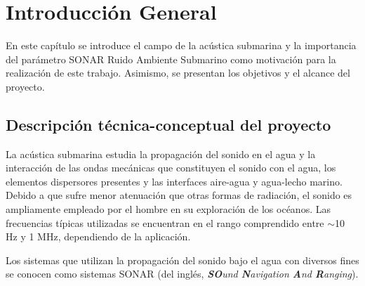 
\chapter{Introducción General} %

\label{Chapter1} %
\label{IntroGeneral}


\newcommand{\keyword}[1]{\textbf{#1}}
\newcommand{\tabhead}[1]{\textbf{#1}}
\newcommand{\code}[1]{\texttt{#1}}
\newcommand{\file}[1]{\texttt{\bfseries#1}}
\newcommand{\option}[1]{\texttt{\itshape#1}}
\newcommand{\grados}{$^{\circ}$}


En este capítulo se introduce el campo de la acústica submarina y la importancia del parámetro SONAR Ruido Ambiente Submarino como motivación para la realización de este trabajo.  Asimismo, se presentan los objetivos y el alcance del proyecto.
\section{Descripción técnica-conceptual del proyecto}


La acústica submarina estudia la propagación del sonido en el agua y la interacción de las ondas mecánicas que constituyen el sonido con el agua, los elementos dispersores presentes y las interfaces aire-agua y agua-lecho marino.  Debido a que sufre menor atenuación que otras formas de radiación, el sonido es ampliamente empleado  por el hombre en su exploración de los océanos.  Las frecuencias típicas utilizadas se encuentran en el rango comprendido entre $\sim$10 Hz y 1 MHz, dependiendo de la aplicación.  

Los sistemas que utilizan la propagación del sonido bajo el agua con diversos fines se conocen como sistemas SONAR (del inglés, \textit{\textbf{SO}und \textbf{N}avigation \textbf{A}nd \textbf{R}anging}).

